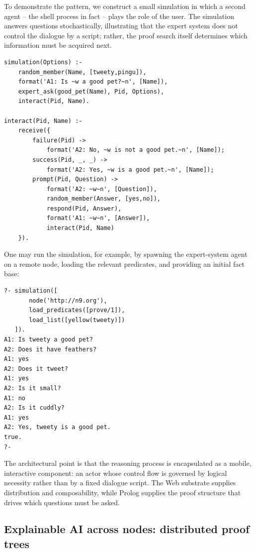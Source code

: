 To demonstrate the pattern, we construct a small simulation in which a second agent -- the shell process in fact -- plays the role of the user. The simulation answers questions stochastically, illustrating that the expert system does not control the dialogue by a script; rather, the proof search itself determines which information must be acquired next.


\begin{verbatim}
simulation(Options) :-
    random_member(Name, [tweety,pingu]),
    format('A1: Is ~w a good pet?~n', [Name]),
    expert_ask(good_pet(Name), Pid, Options),
    interact(Pid, Name).

interact(Pid, Name) :-
    receive({
        failure(Pid) ->
            format('A2: No, ~w is not a good pet.~n', [Name]);
        success(Pid, _, _) ->
            format('A2: Yes, ~w is a good pet.~n', [Name]);
        prompt(Pid, Question) ->
            format('A2: ~w~n', [Question]),
            random_member(Answer, [yes,no]),
            respond(Pid, Answer),
            format('A1: ~w~n', [Answer]),
            interact(Pid, Name)
    }).
\end{verbatim}

\noindent One may run the simulation, for example, by spawning the expert-system agent on a remote node, loading the relevant predicates, and providing an initial fact base:

\begin{verbatim}
?- simulation([
       node('http://n9.org'),
       load_predicates([prove/1]),
       load_list([yellow(tweety)])
   ]).
A1: Is tweety a good pet?
A2: Does it have feathers?
A1: yes
A2: Does it tweet?
A1: yes
A2: Is it small?
A1: no
A2: Is it cuddly?
A1: yes
A2: Yes, tweety is a good pet.
true.
?-
\end{verbatim}

\noindent The architectural point is that the reasoning process is encapsulated as a mobile, interactive component: an actor whose control flow is governed by logical necessity rather than by a fixed dialogue script. The Web substrate supplies distribution and composability, while Prolog supplies the proof structure that drives which questions must be asked.

\subsection{Explainable AI across nodes: distributed proof trees}
\label{sec:distributed-proof-trees}

